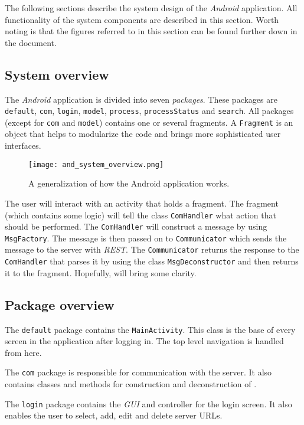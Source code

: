 The following sections describe the system design of the \textit{Android} application. All functionality of the system components are described in this section. Worth noting is that the figures referred to in this section can be found further down in the document.

\subsection{System overview}
	The \textit{Android} application is divided into seven \emph{packages}. These packages are \verb!default!, \verb!com!, \verb!login!, \verb!model!, \verb!process!, \verb!processStatus! and \verb!search!.
	All packages (except for \verb!com! and \verb!model!) contains one or several fragments. A \verb!Fragment! is an object that helps to modularize the code and brings more sophisticated user interfaces.

	\begin{figure}[h]
		\centering
		\texttt{[image: and\_system\_overview.png]}
		\caption{\label{fig:and_system_overview} \footnotesize A generalization of how the Android application works.}
	\end{figure}

	The user will interact with an activity that holds a fragment. The fragment (which contains some logic) will tell the class \verb!ComHandler! what action that should be performed. The \verb!ComHandler! will construct a message by using \verb!MsgFactory!. The message is then passed on to \verb!Communicator! which sends the message to the server with \textit{REST}. The \verb!Communicator! returns the response to the \verb!ComHandler! that parses it by using the class \verb!MsgDeconstructor! and then returns it to the fragment. Hopefully,  will bring some clarity.
	
\subsection{Package overview}
	The \verb!default! package contains the \verb!MainActivity!. This class is the base of every screen in the application after logging in. The top level navigation is handled from here.

	The \verb!com! package is responsible for communication with the server. It also contains classes and methods for construction and deconstruction of \json .

	The \verb!login! package contains the \textit{GUI} and controller for the login screen. It also enables the user to select, add, edit and delete server URLs.
	
